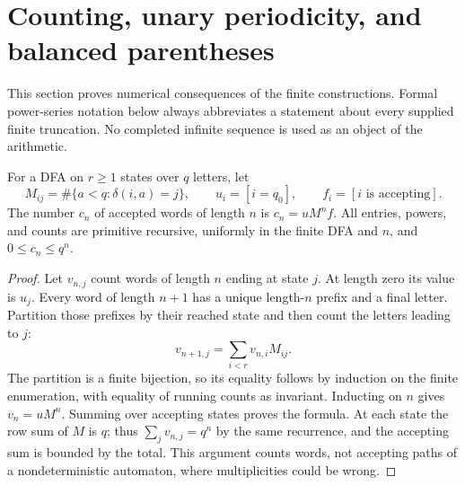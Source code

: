 \section{Counting, unary periodicity, and balanced parentheses}
\label{sec:counting}

This section proves numerical consequences of the finite constructions.
Formal power-series notation below always abbreviates a statement about
every supplied finite truncation. No completed infinite sequence is used
as an object of the arithmetic.

\begin{theorem}
\label{count:matrix}
For a DFA on $r\ge1$ states over $q$ letters, let
\[
 M_{ij}=\#\{a<q:\delta(i,a)=j\},\qquad
 u_i=[i=q_0],\qquad f_i=[i\text{ is accepting}].
\]
The number $c_n$ of accepted words of length $n$ is
$c_n=uM^nf$. All entries, powers, and counts are primitive recursive,
uniformly in the finite DFA and $n$, and $0\le c_n\le q^n$.
\end{theorem}
\begin{proof}
Let $v_{n,j}$ count words of length $n$ ending at state $j$.
At length zero its value is $u_j$. Every word of length $n+1$ has a
unique length-$n$ prefix and a final letter. Partition those prefixes
by their reached state and then count the letters leading to $j$:
\[
 v_{n+1,j}=\sum_{i<r}v_{n,i}M_{ij}.
\]
The partition is a finite bijection, so its equality follows by induction
on the finite enumeration, with equality of running counts as invariant.
Inducting on $n$ gives $v_n=uM^n$. Summing over accepting states proves
the formula. At each state the row sum of $M$ is $q$; thus
$\sum_jv_{n,j}=q^n$ by the same recurrence, and the accepting sum is
bounded by the total. This argument counts words, not accepting paths
of a nondeterministic automaton, where multiplicities could be wrong.
\end{proof}

